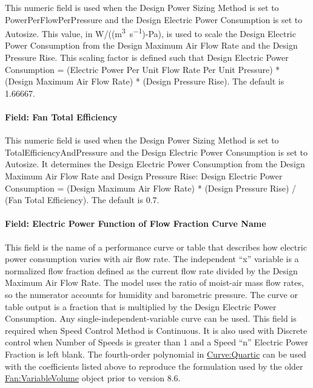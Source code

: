 This numeric field is used when the Design Power Sizing Method is set to PowerPerFlowPerPressure and the Design Electric Power Consumption is set to Autosize. This value, in W/((\si{\m\cubed\per\s})-Pa), is used to scale the Design Electric Power Consumption from the Design Maximum Air Flow Rate and the Design Pressure Rise. This scaling factor is defined such that Design Electric Power Consumption = (Electric Power Per Unit Flow Rate Per Unit Pressure) * (Design Maximum Air Flow Rate) * (Design Pressure Rise).  The default is 1.66667.

\paragraph{Field: Fan Total Efficiency}\label{field-total-efficiency-fansysmodel}

This numeric field is used when the Design Power Sizing Method is set to TotalEfficiencyAndPressure and the Design Electric Power Consumption is set to Autosize. It determines the Design Electric Power Consumption from the Design Maximum Air Flow Rate and Design Pressure Rise: Design Electric Power Consumption = (Design Maximum Air Flow Rate) * (Design Pressure Rise) / (Fan Total Efficiency). The default is 0.7.

\paragraph{Field: Electric Power Function of Flow Fraction Curve Name}\label{field-power-curve-name-fansysmodel}

This field is the name of a performance curve or table that describes how electric power consumption varies with air flow rate. The independent ``x'' variable is a normalized flow fraction defined as the current flow rate divided by the Design Maximum Air Flow Rate. The model uses the ratio of moist-air mass flow rates, so the numerator accounts for humidity and barometric pressure. The curve or table output is a fraction that is multiplied by the Design Electric Power Consumption. Any single-independent-variable curve can be used. This field is required when Speed Control Method is Continuous. It is also used with Discrete control when Number of Speeds is greater than 1 and a Speed ``n'' Electric Power Fraction is left blank. The fourth-order polynomial in \hyperref[curvequartic]{Curve:Quartic} can be used with the coefficients listed above to reproduce the formulation used by the older \hyperref[fanvariablevolume]{Fan:VariableVolume} object prior to version 8.6.


